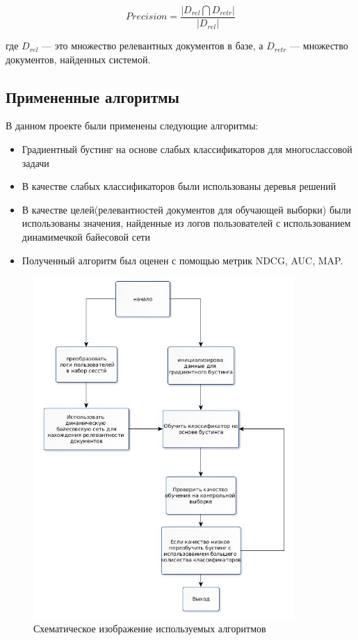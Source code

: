 \begin{equation}
  {Precision}=\frac{|D_{rel}\bigcap D_{retr}|}{|D_{rel}|}
\end{equation}
\par
где $D_{rel}$ — это множество релевантных документов в базе, а $D_{retr}$ — множество документов, найденных системой. 

\subsection{Примененные алгоритмы}

В данном проекте были применены следующие алгоритмы:

\begin{itemize}
	\item Градиентный бустинг на основе слабых классификаторов для многослассовой задачи
	\item В качестве слабых классификаторов были использованы деревья решений
	\item В качестве целей(релевантностей документов для обучающей выборки) были использованы значения, найденные из логов пользователей с использованием динамимечкой байесовой сети
	\item Полученный алгоритм был оценен с помощью метрик NDCG, AUC, MAP.
\end{itemize}

\begin{figure}[!ht]
  \includegraphics[height=130mm,width=\textwidth]{images/architecture_new.jpg}
  \caption{Схематическое изображение используемых алгоритмов\label{architecture}}
\end{figure}

